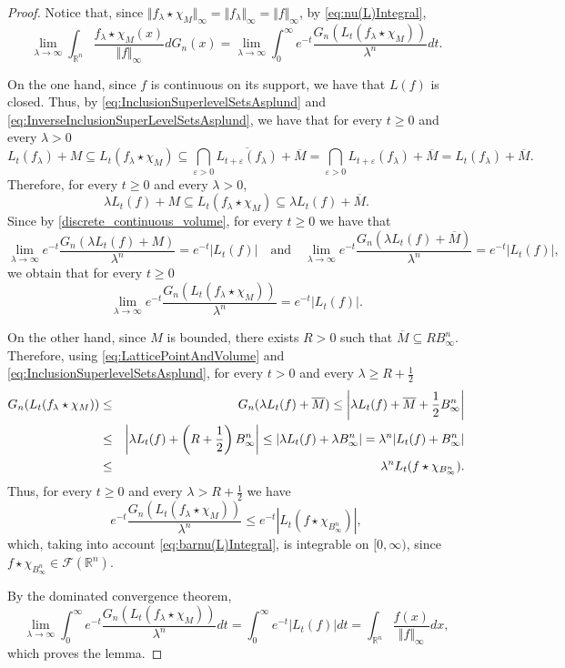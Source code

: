 \documentclass[10pt,a4paper]{amsart}
\newcommand{\R}{\mathbb R}
\begin{document}
\begin{proof}
Notice that, since $\Vert f_\lambda\star\chi_M\Vert_\infty=\Vert f_\lambda\Vert_\infty=\Vert f\Vert_\infty$, by \eqref{eq:nu(L)Integral},
$$
\lim_{\lambda \to \infty} \int_{\R^n} \frac{f_\lambda\star\chi_M (x)}{\Vert f\Vert_\infty} dG_n(x)=\lim_{\lambda\to\infty}\int_0^\infty e^{-t} \frac{G_n (L_t (f_\lambda\star\chi_M))}{\lambda^n}dt.
$$

On the one hand, since $f$ is continuous on its support, we have that $L(f)$ is closed. Thus, by \eqref{eq:InclusionSuperlevelSetsAsplund} and \eqref{eq:InverseInclusionSuperLevelSetsAsplund}, we have that for every $t\geq0$ and every $\lambda>0$
$$
L_t(f_\lambda)+M\subseteq L_t(f_\lambda\star\chi_M)\subseteq\bigcap_{\varepsilon>0}\overline{L_{t+\varepsilon}(f_\lambda)}+\overline{M}=\bigcap_{\varepsilon>0}L_{t+\varepsilon}(f_\lambda)+\overline{M}=L_t(f_\lambda)+\overline{M}.
$$
Therefore, for every $t\geq0$ and every $\lambda>0$,
$$
\lambda L_t(f)+M\subseteq L_t(f_\lambda\star\chi_M)\subseteq \lambda L_t(f)+\overline{M}.
$$
Since by \eqref{discrete_continuous_volume}, for every $t\geq0$ we have that
$$
\lim_{\lambda\to\infty}e^{-t} \frac{G_n (\lambda L_t (f)+M)}{\lambda^n}=e^{-t} |L_t (f)|\quad\textrm{and}\quad\lim_{\lambda\to\infty}e^{-t} \frac{G_n (\lambda L_t (f)+\overline{M})}{\lambda^n}=e^{-t} |L_t (f)|,
$$
we obtain that for every $t\geq0$
$$
\lim_{\lambda\to\infty}e^{-t}\frac{G_n (L_t(f_\lambda\star\chi_M))}{\lambda^n}=e^{-t}|L_t(f)|.
$$


On the other hand, since $M$ is bounded, there exists $R>0$ such that $\overline{M}\subseteq RB_\infty^n$. Therefore,  using \eqref{eq:LatticePointAndVolume} and \eqref{eq:InclusionSuperlevelSetsAsplund}, for every $t>0$ and every $\lambda\geq R+\frac{1}{2}$
\begin{eqnarray*}
G_n(L_t(f_\lambda\star\chi_M))&\leq& G_n(\lambda L_t(f)+\overline{M})\leq\left|\lambda L_t(f)+\overline{M}+\frac{1}{2}B_\infty^n\right|\cr
&\leq&\left|\lambda L_t(f)+\left(R+\frac{1}{2}\right)B_\infty^n\right|\leq\left|\lambda L_t(f)+\lambda B_\infty^n\right|=\lambda^n|L_t(f)+B_\infty^n|\cr
&\leq&\lambda^n L_t(f\star\chi_{B_\infty^n}).
\end{eqnarray*}
 Thus, for every $t\geq0$ and every $\lambda>R+\frac{1}{2}$ we have
$$
e^{-t} \frac{G_n(L_t(f_\lambda\star\chi_M))}{\lambda^n}\leq e^{-t}\left|L_t (f\star \chi_{B_\infty^n})\right|,
$$
which, taking into account \eqref{eq:barnu(L)Integral}, is integrable on $[0,\infty)$, since $f\star \chi_{B_\infty^n}\in\mathcal{F}(\R^n)$.

By the dominated convergence theorem,
$$
\lim_{\lambda\to\infty}\int_0^\infty e^{-t} \frac{G_n(L_t(f_\lambda\star\chi_M))}{\lambda^n}dt=\int_0^\infty e^{-t} |L_t (f)|dt=\int_{\R^n}\frac{f(x)}{\Vert f\Vert_\infty}dx,
$$
which proves the lemma.
\end{proof}
\end{document}
